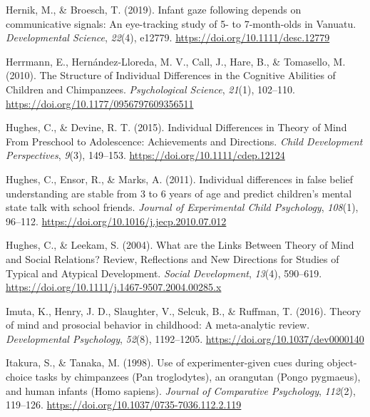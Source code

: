 \documentclass[
  man,floatsintext]{apa6}
\newlength{\cslhangindent}
\newlength{\cslentryspacingunit} %
\newenvironment{CSLReferences}[2] %
 {%
  \setlength{\parindent}{0pt}
  \ifodd #1
  \let\oldpar\par
  \def\par{\hangindent=\cslhangindent\oldpar}
  \fi
  \setlength{\parskip}{#2\cslentryspacingunit}
 }%
 {}
\begin{document}
\begin{CSLReferences}{1}{0}
\leavevmode{}%
Hernik, M., \& Broesch, T. (2019). Infant gaze following depends on communicative signals: {An} eye-tracking study of 5- to 7-month-olds in {Vanuatu}. \emph{Developmental Science}, \emph{22}(4), e12779. \url{https://doi.org/10.1111/desc.12779}

\leavevmode{}%
Herrmann, E., Hernández-Lloreda, M. V., Call, J., Hare, B., \& Tomasello, M. (2010). The {Structure} of {Individual Differences} in the {Cognitive Abilities} of {Children} and {Chimpanzees}. \emph{Psychological Science}, \emph{21}(1), 102--110. \url{https://doi.org/10.1177/0956797609356511}

\leavevmode{}%
Hughes, C., \& Devine, R. T. (2015). Individual {Differences} in {Theory} of {Mind From Preschool} to {Adolescence}: {Achievements} and {Directions}. \emph{Child Development Perspectives}, \emph{9}(3), 149--153. \url{https://doi.org/10.1111/cdep.12124}

\leavevmode{}%
Hughes, C., Ensor, R., \& Marks, A. (2011). Individual differences in false belief understanding are stable from 3 to 6 years of age and predict children's mental state talk with school friends. \emph{Journal of Experimental Child Psychology}, \emph{108}(1), 96--112. \url{https://doi.org/10.1016/j.jecp.2010.07.012}

\leavevmode{}%
Hughes, C., \& Leekam, S. (2004). What are the {Links Between Theory} of {Mind} and {Social Relations}? {Review}, {Reflections} and {New Directions} for {Studies} of {Typical} and {Atypical Development}. \emph{Social Development}, \emph{13}(4), 590--619. \url{https://doi.org/10.1111/j.1467-9507.2004.00285.x}

\leavevmode{}%
Imuta, K., Henry, J. D., Slaughter, V., Selcuk, B., \& Ruffman, T. (2016). Theory of mind and prosocial behavior in childhood: {A} meta-analytic review. \emph{Developmental Psychology}, \emph{52}(8), 1192--1205. \url{https://doi.org/10.1037/dev0000140}

\leavevmode{}%
Itakura, S., \& Tanaka, M. (1998). Use of experimenter-given cues during object-choice tasks by chimpanzees ({Pan} troglodytes), an orangutan ({Pongo} pygmaeus), and human infants ({Homo} sapiens). \emph{Journal of Comparative Psychology}, \emph{112}(2), 119--126. \url{https://doi.org/10.1037/0735-7036.112.2.119}


\end{CSLReferences}
\end{document}
